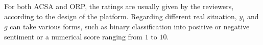 \documentclass[preprint,12pt]{elsarticle}
\begin{document}
For both ACSA and ORP, the ratings are usually given by the reviewers, according to the design of the platform. Regarding different real situation, $y_i$ and $g$ can take various forms, such as binary classification into positive or negative sentiment or a numerical score ranging from $1$ to $10$.



\end{document}
